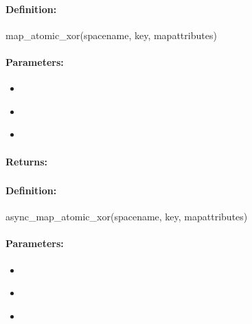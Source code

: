 \paragraph{Definition:}
\begin{rubycode}
map_atomic_xor(spacename, key, mapattributes)
\end{rubycode}

\paragraph{Parameters:}
\begin{itemize}[noitemsep]
\item {}\\

\item {}\\

\item {}\\

\end{itemize}

\paragraph{Returns:}


\pagebreak
\subsubsection{}
\label{api:ruby:async_map_atomic_xor}


\paragraph{Definition:}
\begin{rubycode}
async_map_atomic_xor(spacename, key, mapattributes)
\end{rubycode}

\paragraph{Parameters:}
\begin{itemize}[noitemsep]
\item {}\\

\item {}\\

\item {}\\

\end{itemize}

